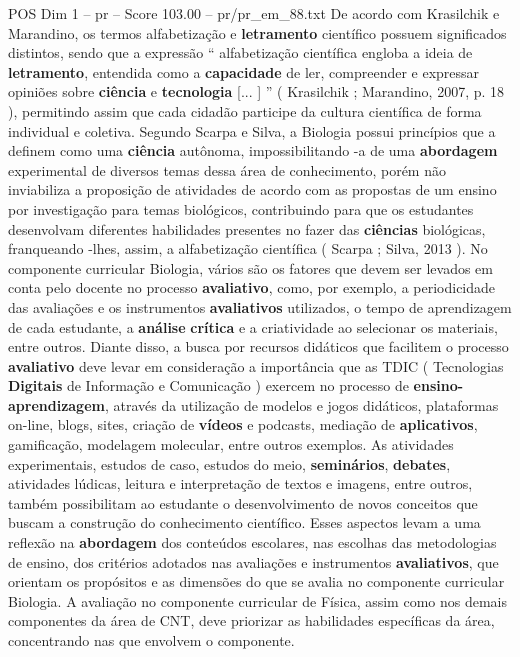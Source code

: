 \begin{textsample}{POS Dim 1 – pr – Score 103.00 – pr/pr\_em\_88.txt}
De acordo com Krasilchik e Marandino, os termos alfabetização e \textbf{letramento} científico possuem significados distintos, sendo que a expressão “ alfabetização científica engloba a ideia de \textbf{letramento}, entendida como a \textbf{capacidade} de ler, compreender e expressar opiniões sobre \textbf{ciência} e \textbf{tecnologia} [... ] ” ( Krasilchik ; Marandino, 2007, p. 18 ), permitindo assim que cada cidadão participe da cultura científica de forma individual e coletiva.
Segundo Scarpa e Silva, a Biologia possui princípios que a definem como uma \textbf{ciência} autônoma, impossibilitando -a de uma \textbf{abordagem} experimental de diversos temas dessa área de conhecimento, porém não inviabiliza a proposição de atividades de acordo com as propostas de um ensino por investigação para temas biológicos, contribuindo para que os estudantes desenvolvam diferentes habilidades presentes no fazer das \textbf{ciências} biológicas, franqueando -lhes, assim, a alfabetização científica ( Scarpa ; Silva, 2013 ).
No componente curricular Biologia, vários são os fatores que devem ser levados em conta pelo docente no processo \textbf{avaliativo}, como, por exemplo, a periodicidade das avaliações e os instrumentos \textbf{avaliativos} utilizados, o tempo de aprendizagem de cada estudante, a \textbf{análise} \textbf{crítica} e a criatividade ao selecionar os materiais, entre outros.
Diante disso, a busca por recursos didáticos que facilitem o processo \textbf{avaliativo} deve levar em consideração a importância que as TDIC ( Tecnologias \textbf{Digitais} de Informação e Comunicação ) exercem no processo de \textbf{ensino-aprendizagem}, através da utilização de modelos e jogos didáticos, plataformas on-line, blogs, sites, criação de \textbf{vídeos} e podcasts, mediação de \textbf{aplicativos}, gamificação, modelagem molecular, entre outros exemplos.
As atividades experimentais, estudos de caso, estudos do meio, \textbf{seminários}, \textbf{debates}, atividades lúdicas, leitura e interpretação de textos e imagens, entre outros, também possibilitam ao estudante o desenvolvimento de novos conceitos que buscam a construção do conhecimento científico.
Esses aspectos levam a uma reflexão na \textbf{abordagem} dos conteúdos escolares, nas escolhas das metodologias de ensino, dos critérios adotados nas avaliações e instrumentos \textbf{avaliativos}, que orientam os propósitos e as dimensões do que se avalia no componente curricular Biologia.
A avaliação no componente curricular de Física, assim como nos demais componentes da área de CNT, deve priorizar as habilidades específicas da área, concentrando nas que envolvem o componente.

\end{textsample}
